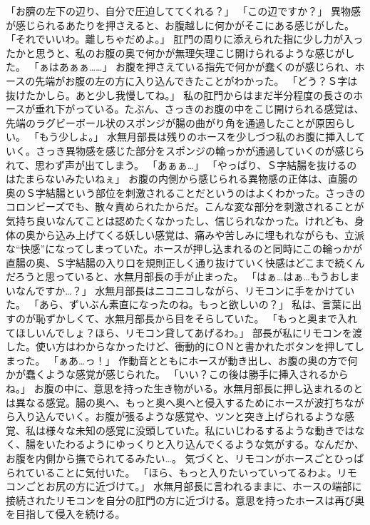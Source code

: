 「お臍の左下の辺り、自分で圧迫しててくれる？」
「この辺ですか？」
異物感が感じられるあたりを押さえると、お腹越しに何かがそこにある感じがした。
「それでいいわ。離しちゃだめよ。」
肛門の周りに添えられた指に少し力が入ったかと思うと、私のお腹の奥で何かが無理矢理こじ開けられるような感じがした。
「ぁはあぁぁ……」
お腹を押さえている指先で何かが蠢くのが感じられ、ホースの先端がお腹の左の方に入り込んできたことがわかった。
「どう？Ｓ字は抜けたかしら。あと少し我慢してね。」
私の肛門からはまだ半分程度の長さのホースが垂れ下がっている。たぶん、さっきのお腹の中をこじ開けられる感覚は、先端のラグビーボール状のスポンジが腸の曲がり角を通過したことが原因らしい。
「もう少しよ。」
水無月部長は残りのホースを少しづつ私のお腹に挿入していく。さっき異物感を感じた部分をスポンジの輪っかが通過していくのが感じられて、思わず声が出てしまう。
「あぁぁ…」
「やっぱり、Ｓ字結腸を抜けるのはたまらないみたいねぇ」
お腹の内側から感じられる異物感の正体は、直腸の奥のＳ字結腸という部位を刺激されることだというのはよくわかった。さっきのコロンビーズでも、散々責められたからだ。こんな変な部分を刺激されることが気持ち良いなんてことは認めたくなかったし、信じられなかった。けれども、身体の奥から込み上げてくる妖しい感覚は、痛みや苦しみに埋もれながらも、立派な“快感”になってしまっていた。ホースが押し込まれるのと同時にこの輪っかが直腸の奥、Ｓ字結腸の入り口を規則正しく通り抜けていく快感はどこまで続くんだろうと思っていると、水無月部長の手が止まった。
「はぁ…はぁ…もうおしまいなんですか…？」
水無月部長はニコニコしながら、リモコンに手をかけていた。
「あら、ずいぶん素直になったのね。もっと欲しいの？」
私は、言葉に出すのが恥ずかしくて、水無月部長から目をそらしていた。
「もっと奥まで入れてほしいんでしょ？ほら、リモコン貸してあげるわ。」
部長が私にリモコンを渡した。使い方はわからなかったけど、衝動的にＯＮと書かれたボタンを押してしまった。
「ぁあ…っ！」
作動音とともにホースが動き出し、お腹の奥の方で何かが蠢くような感覚が感じられた。
「いい？この後は勝手に挿入されるからね。」
お腹の中に、意思を持った生き物がいる。水無月部長に押し込まれるのとは異なる感覚。腸の奥へ、もっと奥へ奥へと侵入するためにホースが波打ちながら入り込んでいく。お腹が張るような感覚や、ツンと突き上げられるような感覚、私は様々な未知の感覚に没頭していた。私にいじわるするような動きではなく、腸をいたわるようにゆっくりと入り込んでくるような気がする。なんだか、お腹を内側から撫でられてるみたい…。
気づくと、リモコンがホースごとひっぱられていることに気付いた。
「ほら、もっと入りたいっていってるわよ。リモコンごとお尻の方に近づけて。」
水無月部長に言われるままに、ホースの端部に接続されたリモコンを自分の肛門の方に近づける。意思を持ったホースは再び奥を目指して侵入を続ける。
